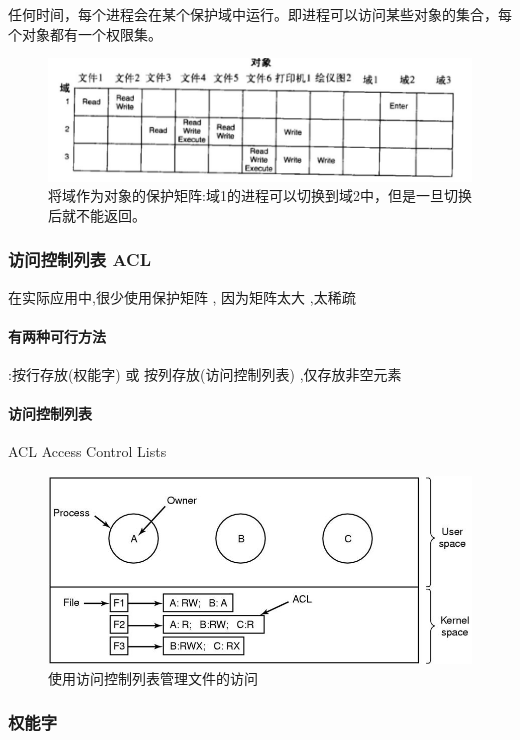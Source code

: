 \documentclass[UTF8,a4paper]{ctexart}
\begin{document}
任何时间，每个进程会在某个保护域中运行。即进程可以访问某些对象的集合，每个对象都有一个权限集。

\begin{figure}[H]
	\centering
	\includegraphics[scale = 0.5]{assets/ModernOperatingSystems/2018-01-10-20-28-58.png}
	\caption{将域作为对象的保护矩阵:域1的进程可以切换到域2中，但是一旦切换后就不能返回。}
\end{figure}

\subsubsection{访问控制列表 ACL}
在实际应用中,很少使用保护矩阵 , 因为矩阵太大 ,太稀疏

\paragraph{有两种可行方法}:按行存放(权能字) 或 按列存放(访问控制列表) ,仅存放非空元素

\paragraph{访问控制列表}	ACL Access Control Lists 

\begin{figure}[H]
	\centering
	\includegraphics[scale = 0.5]{assets/ModernOperatingSystems/2018-01-10-20-33-08.png}
	\caption{使用访问控制列表管理文件的访问}
\end{figure}

\subsubsection{权能字}
\end{document}
